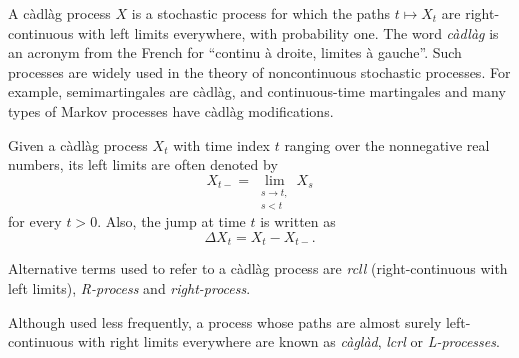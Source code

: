 \documentclass[12pt]{article}
\begin{document}
A c\`adl\`ag process $X$ is a stochastic process for which the paths $t\mapsto X_t$ are right-continuous with left limits everywhere, with probability one. The word \emph{c\`adl\`ag} is an acronym from the French for ``continu \`a droite, limites \`a gauche''.
Such processes are widely used in the theory of noncontinuous stochastic processes. For example, semimartingales are c\`adl\`ag, and continuous-time martingales and many types of Markov processes have c\`adl\`ag modifications.

Given a c\`adl\`ag process $X_t$ with time index $t$ ranging over the nonnegative real numbers, its left limits are often denoted by
\begin{equation*}
X_{t-}=\lim_{\substack{s\rightarrow t,\\ s<t}}X_s
\end{equation*}
for every $t>0$. Also, the jump at time $t$ is written as
\begin{equation*}
\Delta X_t = X_t-X_{t-}.
\end{equation*}

Alternative terms used to refer to a c\`adl\`ag process are \emph{rcll} (right-continuous with left limits), \emph{R-process} and \emph{right-process}.

Although used less frequently, a process whose paths are almost surely left-continuous with right limits everywhere are known as \emph{c\`agl\`ad}, \emph{lcrl} or \emph{L-processes}.

\end{document}

